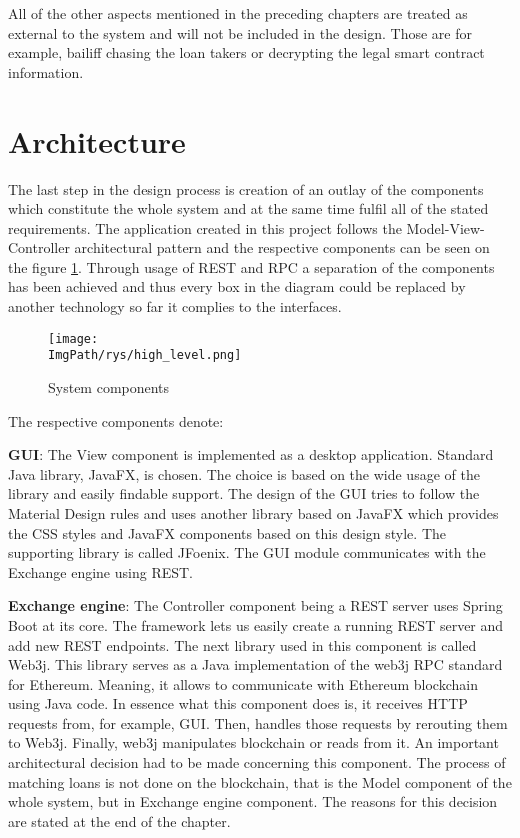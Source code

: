 \documentclass[a4paper,12pt,twoside,openany]{report}
\newcommand{\ImgPath}{.}
\begin{document}
All of the other aspects mentioned in the preceding chapters are treated as external to the system and will not be included in the design. Those are for example, bailiff chasing the loan takers or decrypting the legal smart contract information.

\section{Architecture} \label{architecture}

The last step in the design process is creation of an outlay of the components which constitute the whole system and at the same time fulfil all of the stated requirements. The application created in this project  follows the Model-View-Controller architectural pattern and the respective components can be seen on the figure \ref{system components}. Through usage of REST and RPC a separation of the components has been achieved and thus every box in the diagram could be replaced by another technology so far it complies to the interfaces.

\begin{figure}[!htbp]
	\begin{center}
\centering
\texttt{[image: \\ImgPath/rys/high\_level.png]}
\end{center}
	\caption{System components}
	\label{system components}
\end{figure}

The respective components denote:

\textbf{GUI}: The View component is implemented as a desktop application. Standard Java library, JavaFX, is chosen. The choice is based on the wide usage of the library and easily findable support. The design of the GUI tries to follow the Material Design rules \cite{material} and uses another library based on JavaFX which provides the CSS styles and JavaFX components based on this design style. The supporting library is called JFoenix. The GUI module communicates with the Exchange engine using REST.

\textbf{Exchange engine}: The Controller component being a REST server uses Spring Boot at its core. The framework lets us easily create a running REST server and add new REST endpoints. The next library used in this component is called Web3j. This library serves as a Java implementation of the web3j RPC standard for Ethereum. Meaning, it allows to communicate with Ethereum blockchain using Java code. In essence what this component does is, it receives HTTP requests from, for example, GUI. Then, handles those requests by rerouting them to Web3j. Finally, web3j manipulates blockchain or reads from it. An important architectural decision had to be made concerning this component. The process of matching loans is not done on the blockchain, that is the Model component of the whole system, but in Exchange engine component. The reasons for this decision are stated at the end of the chapter.
\end{document}
